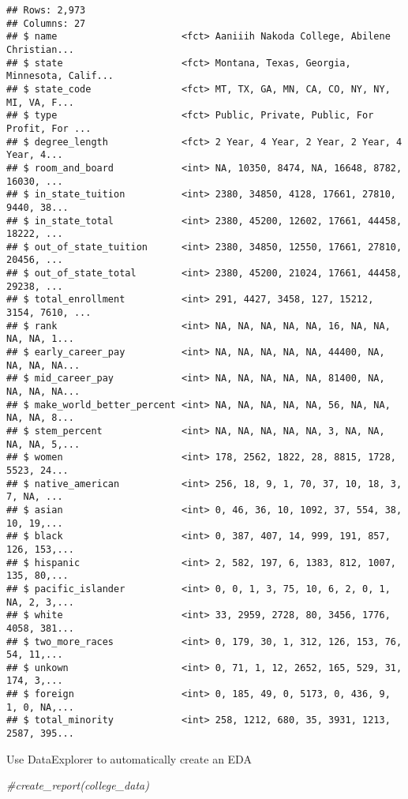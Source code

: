\documentclass[
]{article}
\newenvironment{Shaded}{\begin{snugshade}}{\end{snugshade}}
\newcommand{\CommentTok}[1]{\textcolor[rgb]{0.56,0.35,0.01}{\textit{#1}}}
\begin{document}
\begin{verbatim}
## Rows: 2,973
## Columns: 27
## $ name                      <fct> Aaniiih Nakoda College, Abilene Christian...
## $ state                     <fct> Montana, Texas, Georgia, Minnesota, Calif...
## $ state_code                <fct> MT, TX, GA, MN, CA, CO, NY, NY, MI, VA, F...
## $ type                      <fct> Public, Private, Public, For Profit, For ...
## $ degree_length             <fct> 2 Year, 4 Year, 2 Year, 2 Year, 4 Year, 4...
## $ room_and_board            <int> NA, 10350, 8474, NA, 16648, 8782, 16030, ...
## $ in_state_tuition          <int> 2380, 34850, 4128, 17661, 27810, 9440, 38...
## $ in_state_total            <int> 2380, 45200, 12602, 17661, 44458, 18222, ...
## $ out_of_state_tuition      <int> 2380, 34850, 12550, 17661, 27810, 20456, ...
## $ out_of_state_total        <int> 2380, 45200, 21024, 17661, 44458, 29238, ...
## $ total_enrollment          <int> 291, 4427, 3458, 127, 15212, 3154, 7610, ...
## $ rank                      <int> NA, NA, NA, NA, NA, 16, NA, NA, NA, NA, 1...
## $ early_career_pay          <int> NA, NA, NA, NA, NA, 44400, NA, NA, NA, NA...
## $ mid_career_pay            <int> NA, NA, NA, NA, NA, 81400, NA, NA, NA, NA...
## $ make_world_better_percent <int> NA, NA, NA, NA, NA, 56, NA, NA, NA, NA, 8...
## $ stem_percent              <int> NA, NA, NA, NA, NA, 3, NA, NA, NA, NA, 5,...
## $ women                     <int> 178, 2562, 1822, 28, 8815, 1728, 5523, 24...
## $ native_american           <int> 256, 18, 9, 1, 70, 37, 10, 18, 3, 7, NA, ...
## $ asian                     <int> 0, 46, 36, 10, 1092, 37, 554, 38, 10, 19,...
## $ black                     <int> 0, 387, 407, 14, 999, 191, 857, 126, 153,...
## $ hispanic                  <int> 2, 582, 197, 6, 1383, 812, 1007, 135, 80,...
## $ pacific_islander          <int> 0, 0, 1, 3, 75, 10, 6, 2, 0, 1, NA, 2, 3,...
## $ white                     <int> 33, 2959, 2728, 80, 3456, 1776, 4058, 381...
## $ two_more_races            <int> 0, 179, 30, 1, 312, 126, 153, 76, 54, 11,...
## $ unkown                    <int> 0, 71, 1, 12, 2652, 165, 529, 31, 174, 3,...
## $ foreign                   <int> 0, 185, 49, 0, 5173, 0, 436, 9, 1, 0, NA,...
## $ total_minority            <int> 258, 1212, 680, 35, 3931, 1213, 2587, 395...
\end{verbatim}

Use DataExplorer to automatically create an EDA

\begin{Shaded}
\begin{Highlighting}[]
\CommentTok{#create_report(college_data)}
\end{Highlighting}
\end{Shaded}
\end{document}
